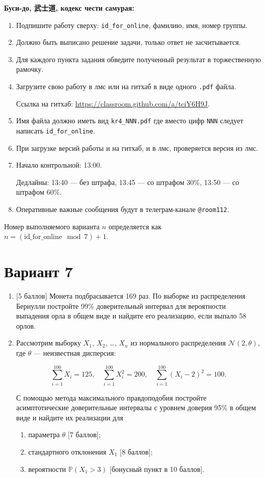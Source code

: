 \documentclass[12pt]{article}
\def \cN{\mathcal{N}}
\def \P{\mathbb{P}}
\newcommand \id {\mathrm{id}\_\mathrm{for}\_\mathrm{online}}
\begin{document}
\textbf{Буси-до, 武士道, кодекс чести самурая:}

\vspace{5mm}

\begin{enumerate}
\item Подпишите работу сверху: \verb|id_for_online|, фамилию, имя, номер группы.
\item Должно быть выписано решение задачи, только ответ не засчитывается.
\item Для каждого пункта задания обведите полученный результат в торжественную рамочку.
\item Загрузите свою работу в лмс или на гитхаб в виде одного \verb|.pdf| файла.

Ссылка на гитхаб: \url{https://classroom.github.com/a/tciY6H9J}.
\item Имя файла должно иметь вид \verb|kr4_NNN.pdf| где вместо цифр \verb|NNN| следует написать \verb|id_for_online|.
\item При загрузке версий работы и на гитхаб, и в лмс, проверяется версия из лмс. 
\item Начало контрольной: 13:00. 

Дедлайны: 13:40 — без штрафа, 13.45 — со штрафом 30\%, 13:50 — со штрафом 60\%.
\item Оперативные важные сообщения будут в телеграм-канале \verb|@room112|.
\end{enumerate}


\newpage
Номер выполняемого варианта $n$ определяется как $n=(\id \mod 7)+1$. 

\section*{Вариант 7}


\begin{enumerate}

\item {[5 баллов]} Монета подбрасывается 169 раз. По выборке из распределения Бернулли
постройте 99\% доверительный интервал для вероятности выпадения орла в общем виде и найдите его
реализацию, если выпало 58 орлов.

\item Рассмотрим выборку $X_1$, $X_2$, \ldots, $X_n$ из нормального распределения $\cN(2, \theta)$, 
где $\theta$ — неизвестная дисперсия:

\[
\sum_{i=1}^{100} X_i = 125, 
\quad \sum_{i=1}^{100} X_i^2 = 200, 
\quad \sum_{i=1}^{100} (X_i - 2)^2 = 100.  
\]

С помощью метода максимального правдоподобия 
постройте асимптотические доверительные интервалы с уровнем доверия 95\% в общем виде и найдите их реализации для  

\begin{enumerate}
  \item параметра $\theta$ {[7 баллов]};
  \item стандартного отклонения $X_1$ {[8 баллов]};
  \item вероятности $\P(X_1 > 3)$ {[бонусный пункт в 10 баллов]}.
\end{enumerate}

\end{enumerate}
\end{document}

